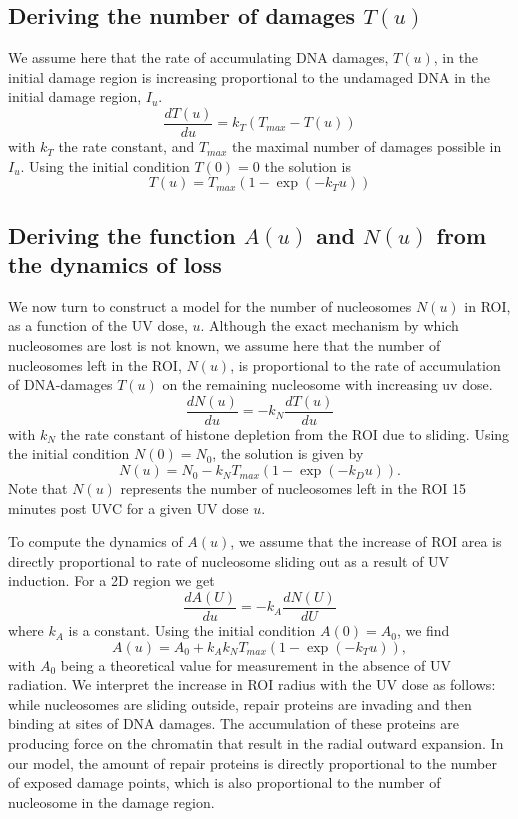 \documentclass[12pt]{article}
\begin{document}
\subsection{Deriving the number of damages $T(u)$}
We assume here that the rate of accumulating DNA damages, $T(u)$, in the initial damage region is increasing proportional to the undamaged DNA in the initial damage region, $I_u$.
\begin{equation}
\frac{dT(u)}{du}=k_T\left(T_{max}-T(u)\right)
\end{equation}
with $k_T$ the rate constant, and $T_{max}$ the maximal number of damages possible in $I_u$. 
Using the initial condition $T(0) = 0$ the solution is
\begin{equation}
T(u) = T_{max}\left(1-\exp(-k_T u)\right) 
\end{equation}

\subsection{Deriving the function $A(u)$ and $N(u)$ from the dynamics of loss}
We now turn to construct a model for the number of nucleosomes $N(u)$ in ROI, as a function of the UV dose, $u$. Although the exact mechanism by which nucleosomes are lost is not known, we assume here that the number of nucleosomes left in the ROI, $N(u)$, is proportional to the rate of accumulation of DNA-damages $T(u)$ on the remaining nucleosome with increasing uv dose.
\begin{equation*}
\frac{dN(u)}{du} = -k_N\frac{dT(u)}{du}
\end{equation*}
with $k_N$ the rate constant of histone depletion from the ROI due to sliding. Using the initial condition $N(0) = N_0$, the solution is given by
\begin{equation}\label{eq:NumHistones}
N(u) = N_0-k_NT_{max}\left(1-\exp(-k_Du)\right).
\end{equation}
Note that $N(u)$ represents the number of nucleosomes left in the ROI 15 minutes post UVC for a given UV dose $u$.

To compute the dynamics of $A(u)$, we assume that the increase of ROI area is directly proportional to rate of nucleosome sliding out as a result of UV induction. For a 2D region we get 
\begin{equation}\label{dralpha}
\frac{dA(U)}{du}=-k_A\frac{dN(U)}{dU}
\end{equation}
where $k_A$ is a constant. Using the initial condition $A(0)=A_0$, we find 
\begin{equation}\label{eq:expansionFactor}
A(u) = A_0 +k_Ak_NT_{max}\left(1-\exp(-k_Tu)\right),
\end{equation}
with $A_0$ being a theoretical value for measurement in the absence of UV radiation. We interpret the increase in ROI radius with the UV dose as follows: while nucleosomes are sliding outside, repair proteins are invading and then binding at sites of DNA damages. The accumulation of these proteins are producing force on the chromatin that result in the radial outward expansion. In our model, the amount of repair proteins is directly proportional to the number of exposed damage points, which is also proportional to the number of nucleosome in the damage region.
\end{document}
